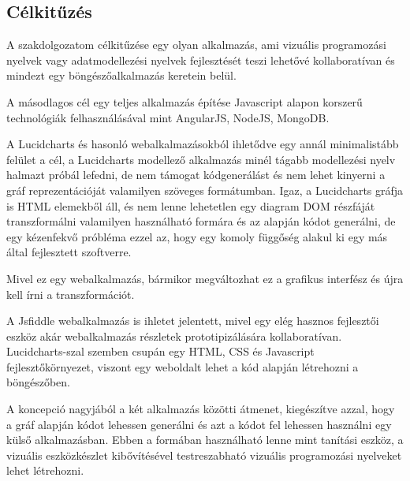 \subsection{Célkitűzés}

A szakdolgozatom célkitűzése egy olyan alkalmazás, ami vizuális programozási nyelvek vagy adatmodellezési nyelvek fejlesztését teszi lehetővé kollaboratívan és mindezt egy böngészőalkalmazás keretein belül.

A másodlagos cél egy teljes alkalmazás építése Javascript alapon korszerű technológiák felhasználásával mint AngularJS, NodeJS, MongoDB.

A Lucidcharts és hasonló webalkalmazásokból ihletődve egy annál minimalistább felület a cél, a Lucidcharts modellező alkalmazás minél tágabb modellezési nyelv halmazt próbál lefedni, de nem támogat kódgenerálást és nem lehet kinyerni a gráf reprezentációját valamilyen szöveges formátumban. Igaz, a Lucidcharts gráfja is HTML elemekből áll, és nem lenne lehetetlen egy diagram DOM részfáját transzformálni valamilyen használható formára és az alapján kódot generálni, de egy kézenfekvő próbléma ezzel az, hogy egy komoly függőség alakul ki egy más által fejlesztett szoftverre.

Mivel ez egy webalkalmazás, bármikor megváltozhat ez a grafikus interfész és újra kell írni a transzformációt. 

A Jsfiddle webalkalmazás is ihletet jelentett, mivel egy elég hasznos fejlesztői eszköz akár webalkalmazás részletek prototipizálására kollaboratívan. Lucidcharts-szal szemben csupán egy HTML, CSS és Javascript fejlesztőkörnyezet, viszont egy weboldalt lehet a kód alapján létrehozni a böngészőben. 


A koncepció nagyjából a két alkalmazás közötti átmenet, kiegészítve azzal, hogy a gráf alapján kódot lehessen generálni és azt a kódot fel lehessen használni egy külső alkalmazásban. Ebben a formában használható lenne mint tanítási eszköz, a vizuális eszközkészlet kibővítésével testreszabható vizuális programozási nyelveket lehet létrehozni.

